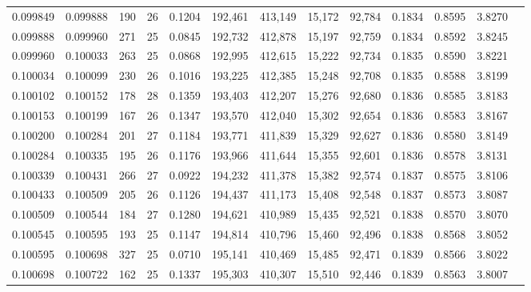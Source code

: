 \begin{tabular}{rrrrrrrrrrrrr}
0.099849 & 0.099888 & 190 &  26 &                                     0.1204 & 192,461 & 413,149 &  15,172 &  92,784 & 0.1834 & 0.8595 & 3.8270 \\
0.099888 & 0.099960 & 271 &  25 &                                     0.0845 & 192,732 & 412,878 &  15,197 &  92,759 & 0.1834 & 0.8592 & 3.8245 \\
0.099960 & 0.100033 & 263 &  25 &                                     0.0868 & 192,995 & 412,615 &  15,222 &  92,734 & 0.1835 & 0.8590 & 3.8221 \\
0.100034 & 0.100099 & 230 &  26 &                                     0.1016 & 193,225 & 412,385 &  15,248 &  92,708 & 0.1835 & 0.8588 & 3.8199 \\
0.100102 & 0.100152 & 178 &  28 &                                     0.1359 & 193,403 & 412,207 &  15,276 &  92,680 & 0.1836 & 0.8585 & 3.8183 \\
0.100153 & 0.100199 & 167 &  26 &                                     0.1347 & 193,570 & 412,040 &  15,302 &  92,654 & 0.1836 & 0.8583 & 3.8167 \\
0.100200 & 0.100284 & 201 &  27 &                                     0.1184 & 193,771 & 411,839 &  15,329 &  92,627 & 0.1836 & 0.8580 & 3.8149 \\
0.100284 & 0.100335 & 195 &  26 &                                     0.1176 & 193,966 & 411,644 &  15,355 &  92,601 & 0.1836 & 0.8578 & 3.8131 \\
0.100339 & 0.100431 & 266 &  27 &                                     0.0922 & 194,232 & 411,378 &  15,382 &  92,574 & 0.1837 & 0.8575 & 3.8106 \\
0.100433 & 0.100509 & 205 &  26 &                                     0.1126 & 194,437 & 411,173 &  15,408 &  92,548 & 0.1837 & 0.8573 & 3.8087 \\
0.100509 & 0.100544 & 184 &  27 &                                     0.1280 & 194,621 & 410,989 &  15,435 &  92,521 & 0.1838 & 0.8570 & 3.8070 \\
0.100545 & 0.100595 & 193 &  25 &                                     0.1147 & 194,814 & 410,796 &  15,460 &  92,496 & 0.1838 & 0.8568 & 3.8052 \\
0.100595 & 0.100698 & 327 &  25 &                                     0.0710 & 195,141 & 410,469 &  15,485 &  92,471 & 0.1839 & 0.8566 & 3.8022 \\
0.100698 & 0.100722 & 162 &  25 &                                     0.1337 & 195,303 & 410,307 &  15,510 &  92,446 & 0.1839 & 0.8563 & 3.8007 \\

\end{tabular}
